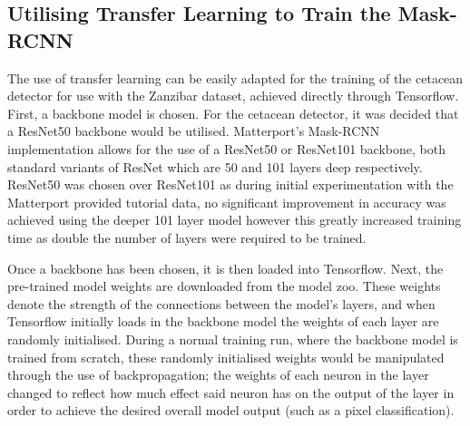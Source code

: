 \subsection{Utilising Transfer Learning to Train the Mask-RCNN}\label{ch:cetDet,sec:initialTesting,sub:transferLearningforTheDetector}

The use of transfer learning can be easily adapted for the training of the cetacean detector for use with the Zanzibar dataset, achieved directly through Tensorflow. First, a backbone model is chosen. For the cetacean detector, it was decided that a ResNet50 backbone would be utilised. Matterport's Mask-RCNN implementation allows for the use of a ResNet50 or ResNet101 backbone, both standard variants of ResNet which are 50 and 101 layers deep respectively. ResNet50 was chosen over ResNet101 as during initial experimentation with the Matterport provided tutorial data, no significant improvement in accuracy was achieved using the deeper 101 layer model however this greatly increased training time as double the number of layers were required to be trained. 

Once a backbone has been chosen, it is then loaded into Tensorflow. Next, the pre-trained model weights are downloaded from the model zoo. These weights denote the strength of the connections between the model's layers, and when Tensorflow initially loads in the backbone model the weights of each layer are randomly initialised. During a normal training run, where the backbone model is trained from scratch, these randomly initialised weights would be manipulated through the use of backpropagation; the weights of each neuron in the layer changed to reflect how much effect said neuron has on the output of the layer in order to achieve the desired overall model output (such as a pixel classification). 

